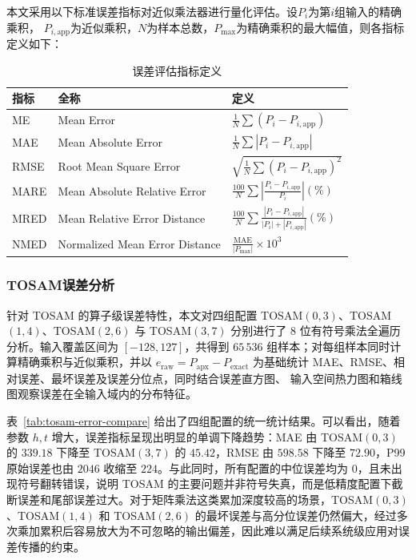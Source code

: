 \documentclass[12pt,a4paper,UTF8]{article}
\begin{document}
本文采用以下标准误差指标对近似乘法器进行量化评估。设$P_i$为第$i$组输入的精确乘积，
$P_{i,\mathrm{app}}$为近似乘积，$N$为样本总数，$P_{\max}$为精确乘积的最大幅值，则各指标定义如下：

\begin{table}[H]
\centering
\caption{误差评估指标定义}
\label{tab:error_metrics_def}
\begin{tabular}{lll}
\toprule
\textbf{指标} & \textbf{全称} & \textbf{定义} \\
\midrule
ME & Mean Error & $\frac{1}{N}\sum (P_i - P_{i,\mathrm{app}})$ \\
MAE & Mean Absolute Error & $\frac{1}{N}\sum |P_i - P_{i,\mathrm{app}}|$ \\
RMSE & Root Mean Square Error & $\sqrt{\frac{1}{N}\sum(P_i - P_{i,\mathrm{app}})^2}$ \\
MARE & Mean Absolute Relative Error & $\frac{100}{N}\sum \left|\frac{P_i - P_{i,\mathrm{app}}}{P_i}\right| (\%)$ \\
MRED & Mean Relative Error Distance & $\frac{100}{N}\sum \frac{|P_i - P_{i,\mathrm{app}}|}{|P_i| + |P_{i,\mathrm{app}}|} (\%)$ \\
NMED & Normalized Mean Error Distance & $\frac{\mathrm{MAE}}{|P_{\max}|} \times 10^3$ \\
\bottomrule
\end{tabular}
\end{table}

\subsubsection{TOSAM误差分析}

针对 TOSAM 的算子级误差特性，本文对四组配置 TOSAM$(0,3)$、TOSAM$(1,4)$、TOSAM$(2,6)$ 
与 TOSAM$(3,7)$ 分别进行了 8 位有符号乘法全遍历分析。输入覆盖区间为 $[-128,127]$，共得到 $65\,536$ 组样本；对每组样本同时计算精确乘积与近似乘积，并以
\(
e_{\mathrm{raw}}=P_{\mathrm{apx}}-P_{\mathrm{exact}}
\)
为基础统计 MAE、RMSE、相对误差、最坏误差及误差分位点，同时结合误差直方图、
输入空间热力图和箱线图观察误差在全输入域内的分布特征。

表~\ref{tab:tosam-error-compare} 给出了四组配置的统一统计结果。可以看出，随着参数 $h,t$ 增大，误差指标呈现出明显的单调下降趋势：MAE 由 TOSAM$(0,3)$ 的 $339.18$ 下降至 TOSAM$(3,7)$ 的 $45.42$，RMSE 由 $598.58$ 下降至 $72.90$，P99 原始误差也由 $2046$ 收缩至 $224$。与此同时，所有配置的中位误差均为 0，且未出现符号翻转错误，说明 TOSAM 的主要问题并非符号失真，而是低精度配置下截断误差和尾部误差过大。对于矩阵乘法这类累加深度较高的场景，TOSAM$(0,3)$、TOSAM$(1,4)$ 和 TOSAM$(2,6)$ 的最坏误差与高分位误差仍然偏大，经过多次乘加累积后容易放大为不可忽略的输出偏差，因此难以满足后续系统级应用对误差传播的约束。
\end{document}
